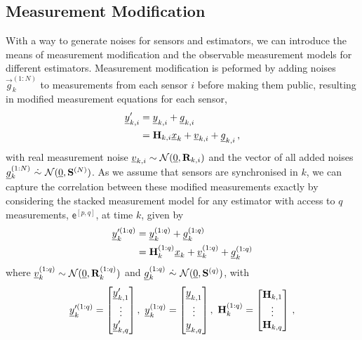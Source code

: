 \subsection{Measurement Modification}\label{subsec:priv_estimation:fus_measurement_mod}
With a way to generate noises for sensors and estimators, we can introduce the means of measurement modification and the observable measurement models for different estimators. Measurement modification is peformed by adding noises $\vec{g}_k^{(1:N)}$ to measurements from each sensor $i$ before making them public, resulting in modified measurement equations for each sensor,
\begin{equation}\label{eqn:modified_measurement_priv2}
\begin{split}
  {\underline{y}}_{k,i}^\prime &= {\underline{y}}_{k,i} + {\underline{g}}_{k,i}\\
  &= {{\mathbf{H}}}_{k,i}{\underline{x}}_k + {\underline{v}}_{k,i} + {\underline{g}}_{k,i}\,,
\end{split}
\end{equation}
with real measurement noise ${\underline{v}}_{k,i}\sim\mathcal{N}({\underline{0}},{{\mathbf{R}}}_{k,i})$ and the vector of all added noises ${\underline{g}}_k^{(1:N)}\ \dot{\sim}\ \mathcal{N}({\underline{0}}, {{\mathbf{S}}}^{(N)})$. As we assume that sensors are synchronised in $k$, we can capture the correlation between these modified measurements exactly by considering the stacked measurement model for any estimator with access to $q$ measurements, $\mathsf{e}^{[p,q]}$, at time $k$, given by
\begin{equation}\label{eqn:measurement_equation}
  \begin{split}
    {\underline{y}}_k^{\prime(1:q)} &= {\underline{y}}_k^{(1:q)} + {\underline{g}}_k^{(1:q)}\\
    &= {{\mathbf{H}}}_k^{(1:q)}{\underline{x}}_k + {\underline{v}}_k^{(1:q)} + {\underline{g}}_k^{(1:q)}
  \end{split}
\end{equation}
where ${\underline{v}}_k^{(1:q)}\sim\mathcal{N}({\underline{0}},{{\mathbf{R}}}_k^{(1:q)})$ and $\vec{g}_k^{(1:q)}\ \dot{\sim}\ \mathcal{N}(\vec{0},\mat{S}^{(q)})$, with
\begin{equation*}
  \vec{y}_k^{\prime(1:q)}=
  \begin{bmatrix}
    \vec{y}_{k,1}^\prime\\
    \vdots\\
    \vec{y}_{k,q}^\prime
  \end{bmatrix},\ 
  \vec{y}_k^{(1:q)}=
  \begin{bmatrix}
    \vec{y}_{k,1}\\
    \vdots\\
    \vec{y}_{k,q}
  \end{bmatrix},\ 
  \mat{H}_k^{(1:q)}=
  \begin{bmatrix}
    \mat{H}_{k,1}\\
    \vdots\\
    \mat{H}_{k,q}\\
  \end{bmatrix}\,,
\end{equation*}
